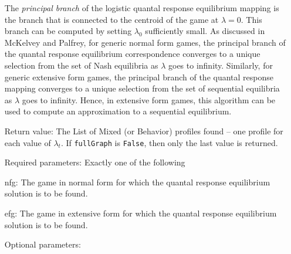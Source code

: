 \begin{itemize}
The {\em principal branch} of the logistic quantal response
equilibrium mapping is the branch that is connected to the centroid of
the game at $\lambda = 0$.  This branch can be computed by setting
$\lambda_0$ sufficiently small.  As discussed in McKelvey and Palfrey,
for generic normal form games, the principal branch of the quantal
response equilibrium correspondence converges to a unique selection
from the set of Nash equilibria as $\lambda$ goes to infinity.
Similarly, for generic extensive form games, the principal branch of
the quantal response mapping converges to a unique selection from the
set of sequential equilibria as $\lambda$ goes to infinity.  Hence, in
extensive form games, this algorithm can be used to compute an
approximation to a sequential equilibrium.
\item
[Return value:] The List of Mixed (or Behavior) profiles found -- one
profile for each value of $\lambda_t$.  If \verb+fullGraph+ is
\verb+False+, then only the last value is returned.  
\item 
[Required parameters:]\hfil\null Exactly one of the following

\bd
\item
[nfg:] The game in normal form for which the quantal response
equilibrium solution is to be
found.
\item	
[efg:] The game in extensive form for which the quantal response
equilibrium solution is to be found.
\ed

\item
[Optional parameters:]\hfil\null


\end{itemize}
